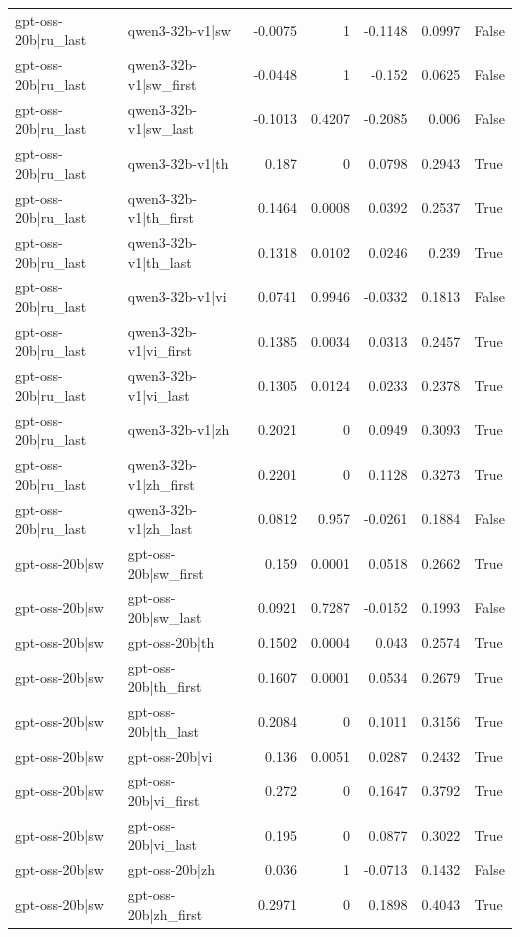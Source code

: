 \begin{table}
\begin{tabular}{l l r r r r l}
gpt-oss-20b|ru_last & qwen3-32b-v1|sw & -0.0075 & 1 & -0.1148 & 0.0997 & False \\
gpt-oss-20b|ru_last & qwen3-32b-v1|sw_first & -0.0448 & 1 & -0.152 & 0.0625 & False \\
gpt-oss-20b|ru_last & qwen3-32b-v1|sw_last & -0.1013 & 0.4207 & -0.2085 & 0.006 & False \\
gpt-oss-20b|ru_last & qwen3-32b-v1|th & 0.187 & 0 & 0.0798 & 0.2943 & True \\
gpt-oss-20b|ru_last & qwen3-32b-v1|th_first & 0.1464 & 0.0008 & 0.0392 & 0.2537 & True \\
gpt-oss-20b|ru_last & qwen3-32b-v1|th_last & 0.1318 & 0.0102 & 0.0246 & 0.239 & True \\
gpt-oss-20b|ru_last & qwen3-32b-v1|vi & 0.0741 & 0.9946 & -0.0332 & 0.1813 & False \\
gpt-oss-20b|ru_last & qwen3-32b-v1|vi_first & 0.1385 & 0.0034 & 0.0313 & 0.2457 & True \\
gpt-oss-20b|ru_last & qwen3-32b-v1|vi_last & 0.1305 & 0.0124 & 0.0233 & 0.2378 & True \\
gpt-oss-20b|ru_last & qwen3-32b-v1|zh & 0.2021 & 0 & 0.0949 & 0.3093 & True \\
gpt-oss-20b|ru_last & qwen3-32b-v1|zh_first & 0.2201 & 0 & 0.1128 & 0.3273 & True \\
gpt-oss-20b|ru_last & qwen3-32b-v1|zh_last & 0.0812 & 0.957 & -0.0261 & 0.1884 & False \\
gpt-oss-20b|sw & gpt-oss-20b|sw_first & 0.159 & 0.0001 & 0.0518 & 0.2662 & True \\
gpt-oss-20b|sw & gpt-oss-20b|sw_last & 0.0921 & 0.7287 & -0.0152 & 0.1993 & False \\
gpt-oss-20b|sw & gpt-oss-20b|th & 0.1502 & 0.0004 & 0.043 & 0.2574 & True \\
gpt-oss-20b|sw & gpt-oss-20b|th_first & 0.1607 & 0.0001 & 0.0534 & 0.2679 & True \\
gpt-oss-20b|sw & gpt-oss-20b|th_last & 0.2084 & 0 & 0.1011 & 0.3156 & True \\
gpt-oss-20b|sw & gpt-oss-20b|vi & 0.136 & 0.0051 & 0.0287 & 0.2432 & True \\
gpt-oss-20b|sw & gpt-oss-20b|vi_first & 0.272 & 0 & 0.1647 & 0.3792 & True \\
gpt-oss-20b|sw & gpt-oss-20b|vi_last & 0.195 & 0 & 0.0877 & 0.3022 & True \\
gpt-oss-20b|sw & gpt-oss-20b|zh & 0.036 & 1 & -0.0713 & 0.1432 & False \\
gpt-oss-20b|sw & gpt-oss-20b|zh_first & 0.2971 & 0 & 0.1898 & 0.4043 & True \\

\end{tabular}
\end{table}
